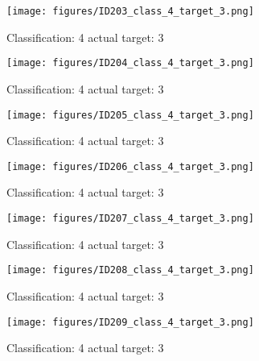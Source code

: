 \begin{figure}[h!]
\begin{center}
\texttt{[image: figures/ID203\_class\_4\_target\_3.png]}
\end{center}
\caption{ Classification: 4 actual target: 3}
\label{fig:ID203_class_4_target_3}
\end{figure}
\begin{figure}[h!]
\begin{center}
\texttt{[image: figures/ID204\_class\_4\_target\_3.png]}
\end{center}
\caption{ Classification: 4 actual target: 3}
\label{fig:ID204_class_4_target_3}
\end{figure}
\begin{figure}[h!]
\begin{center}
\texttt{[image: figures/ID205\_class\_4\_target\_3.png]}
\end{center}
\caption{ Classification: 4 actual target: 3}
\label{fig:ID205_class_4_target_3}
\end{figure}
\begin{figure}[h!]
\begin{center}
\texttt{[image: figures/ID206\_class\_4\_target\_3.png]}
\end{center}
\caption{ Classification: 4 actual target: 3}
\label{fig:ID206_class_4_target_3}
\end{figure}
\begin{figure}[h!]
\begin{center}
\texttt{[image: figures/ID207\_class\_4\_target\_3.png]}
\end{center}
\caption{ Classification: 4 actual target: 3}
\label{fig:ID207_class_4_target_3}
\end{figure}
\begin{figure}[h!]
\begin{center}
\texttt{[image: figures/ID208\_class\_4\_target\_3.png]}
\end{center}
\caption{ Classification: 4 actual target: 3}
\label{fig:ID208_class_4_target_3}
\end{figure}
\begin{figure}[h!]
\begin{center}
\texttt{[image: figures/ID209\_class\_4\_target\_3.png]}
\end{center}
\caption{ Classification: 4 actual target: 3}
\label{fig:ID209_class_4_target_3}
\end{figure}
